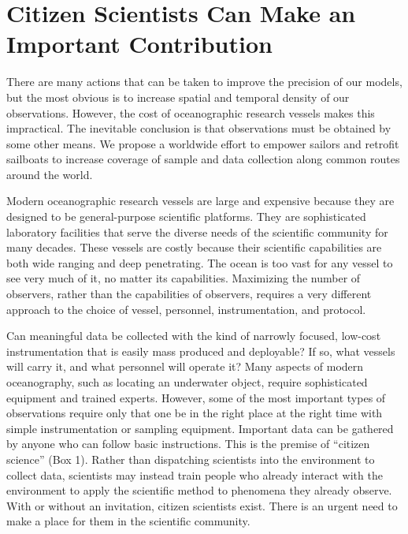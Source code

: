 \section{Citizen Scientists Can Make an Important Contribution}

There are many actions that can be taken to improve the precision of our models, but the most obvious is to increase spatial and temporal density of our observations. However, the cost of oceanographic research vessels makes this impractical. The inevitable conclusion is that observations must be obtained by some other means. We propose a worldwide effort to empower sailors and retrofit sailboats to increase coverage of sample and data collection along common routes around the world.

Modern oceanographic research vessels are large and expensive because they are designed to be general-purpose scientific platforms. They are sophisticated laboratory facilities that serve the diverse needs of the scientific community for many decades. These vessels are costly because their scientific capabilities are both wide ranging and deep penetrating. The ocean is too vast for any vessel to see very much of it, no matter its capabilities. Maximizing the number of observers, rather than the capabilities of observers, requires a very different approach to the choice of vessel, personnel, instrumentation, and protocol.

Can meaningful data be collected with the kind of narrowly focused, low-cost instrumentation that is easily mass produced and deployable? If so, what vessels will carry it, and what personnel will operate it? Many aspects of modern oceanography, such as locating an underwater object, require sophisticated equipment and trained experts. However, some of the most important types of observations require only that one be in the right place at the right time with simple instrumentation or sampling equipment. Important data can be gathered by anyone who can follow basic instructions. This is the premise of “citizen science” (Box 1). Rather than dispatching scientists into the environment to collect data, scientists may instead train people who already interact with the environment to apply the scientific method to phenomena they already observe. With or without an invitation, citizen scientists exist. There is an urgent need to make a place for them in the scientific community.
